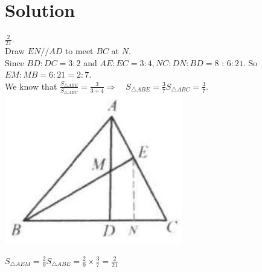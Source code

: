 \documentclass{article}
\begin{document}
\section*{Solution}
\(\frac{2}{21}\).\\
Draw \(E N / / A D\) to meet \(B C\) at \(N\).\\
Since \(B D: D C=3: 2\) and \(A E: E C=3: 4, N C: D N: B D=8\) : \(6: 21\). So \(E M: M B=6: 21=2: 7\).\\
We know that \(\frac{S_{\triangle A B E}}{S_{\triangle A B C}}=\frac{3}{3+4} \Rightarrow \quad S_{\triangle A B E}=\frac{3}{7} S_{\triangle A B C}=\frac{3}{7}\).\\
\centering
\includegraphics[width=\textwidth]{images/133(2).jpg}


\(S_{\triangle A E M}=\frac{2}{9} S_{\triangle A B E}=\frac{2}{9} \times \frac{3}{7}=\frac{2}{21}\)
\end{document}
